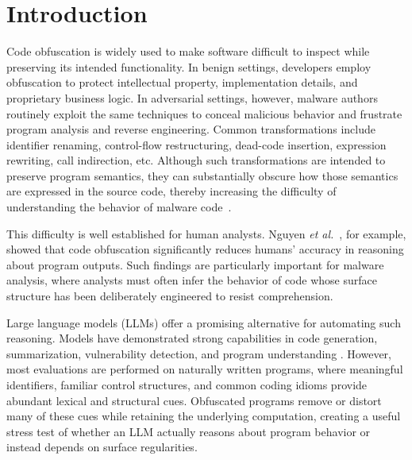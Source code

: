 \section{Introduction}

Code obfuscation is widely used to make software difficult to inspect
while preserving its intended functionality. In benign settings,
developers employ obfuscation to protect intellectual property,
implementation details, and proprietary business logic. In adversarial
settings, however, malware authors routinely exploit the same
techniques to conceal malicious behavior and frustrate program
analysis and reverse engineering. Common transformations include
identifier renaming, control-flow restructuring, dead-code insertion,
expression rewriting, call indirection, etc. Although such
transformations are intended to preserve program semantics, they can
substantially obscure how those semantics are expressed in the source
code, thereby increasing the difficulty of understanding the
behavior of malware code~\cite{collberg1997taxonomy,collberg2002manufacturing,
Obfuscation-The-Hidden-Malware,
An-Observational-Investigation-of-Reverse-Engineers-Process-and-Mental-Models}.

This difficulty is well established for human analysts. Nguyen
{\em et al.}~\cite{nguyen2026effectcodeobfuscationhuman}, for example,
showed that code obfuscation significantly reduces humans' accuracy in
reasoning about program outputs. Such findings are particularly
important for malware analysis, where analysts must often infer the
behavior of code whose surface structure has been deliberately
engineered to resist comprehension.

Large language models (LLMs) offer a promising alternative for
automating such reasoning. Models have demonstrated strong
capabilities in code generation, summarization, vulnerability
detection, and program understanding
\cite{chen2021evaluatinglargelanguagemodels,li2022codebert,
guo2021graphcodebert,roziere2023codegen,
Competition-level-code-generation-with-AlphaCode}.
However, most evaluations are performed on naturally written programs,
where meaningful identifiers, familiar control structures, and common
coding idioms provide abundant lexical and structural cues. Obfuscated
programs remove or distort many of these cues while retaining the
underlying computation, creating a useful stress test of whether an
LLM actually reasons about program behavior or instead depends on
surface regularities.

